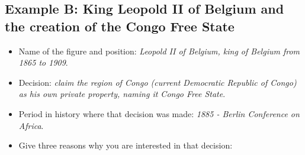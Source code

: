 \documentclass[12pt]{article}
\begin{document}
\subsection*{Example B: King Leopold II of Belgium and the creation of the Congo Free State}

\begin{Form}
\begin{itemize}
    \item Name of the figure and position: \textit{Leopold II of Belgium, king of Belgium from 1865 to 1909}.
    \item Decision: \textit{claim the region of Congo (current Democratic Republic of Congo) as his own private property, naming it Congo Free State}.
    \item Period in history where that decision was made: \textit{1885 - Berlin Conference on Africa}.
    \item Give three reasons why you are interested in that decision:\\[0.2cm]
\TextField[name=reasonstatcher,width=\linewidth,height=2cm,multiline=true, bordercolor={0 0 0}]{}
\end{itemize}
\end{Form}
\end{document}
